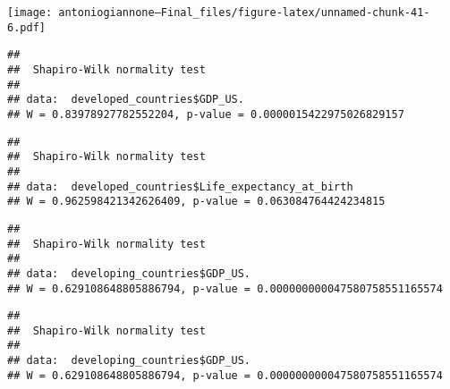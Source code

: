 \documentclass[
]{article}
\newenvironment{Shaded}{\begin{snugshade}}{\end{snugshade}}
\newcommand{\FunctionTok}[1]{\textcolor[rgb]{0.13,0.29,0.53}{\textbf{#1}}}
\newcommand{\NormalTok}[1]{#1}
\newcommand{\SpecialCharTok}[1]{\textcolor[rgb]{0.81,0.36,0.00}{\textbf{#1}}}
\begin{document}
\texttt{[image: antoniogiannone---Final\_files/figure-latex/unnamed-chunk-41-6.pdf]}

\begin{Shaded}
\end{Shaded}

\begin{verbatim}
## 
##  Shapiro-Wilk normality test
## 
## data:  developed_countries$GDP_US.
## W = 0.83978927782552204, p-value = 0.0000015422975026829157
\end{verbatim}

\begin{Shaded}
\end{Shaded}

\begin{verbatim}
## 
##  Shapiro-Wilk normality test
## 
## data:  developed_countries$Life_expectancy_at_birth
## W = 0.962598421342626409, p-value = 0.063084764424234815
\end{verbatim}

\begin{Shaded}
\end{Shaded}

\begin{verbatim}
## 
##  Shapiro-Wilk normality test
## 
## data:  developing_countries$GDP_US.
## W = 0.629108648805886794, p-value = 0.000000000047580758551165574
\end{verbatim}

\begin{Shaded}
\end{Shaded}

\begin{verbatim}
## 
##  Shapiro-Wilk normality test
## 
## data:  developing_countries$GDP_US.
## W = 0.629108648805886794, p-value = 0.000000000047580758551165574
\end{verbatim}
\end{document}
